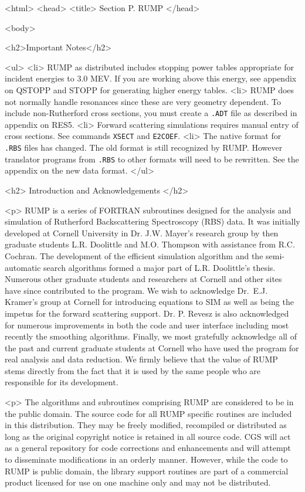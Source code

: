 <html>
<head>
<title> Section P. RUMP
</head>

<body>

<h2>Important Notes</h2>

<ul>
<li> RUMP as distributed includes stopping power tables
appropriate for incident energies to 3.0 MEV.  If you are working above this
energy, see appendix on QSTOPP and STOPP for generating higher energy tables.
<li> RUMP does not normally handle resonances since these are very
geometry dependent.  To include non-Rutherford cross sections, you must
create a {\tt .ADT} file as described in appendix on RES5.
<li> Forward scattering simulations requires manual entry of cross
sections.  See commands {\tt XSECT} and {\tt E2COEF}.
<li> The native format for {\tt .RBS} files has changed. The old
format is still recognized by RUMP.  However translator programs from
{\tt .RBS} to other formats will need to be rewritten.  See the appendix on
the new data format.
</ul>

<h2> Introduction and Acknowledgements </h2>

<p> 
RUMP is a series of FORTRAN subroutines designed for the analysis and
simulation of Rutherford Backscattering Spectroscopy (RBS) data.  It was
initially developed at Cornell University in Dr. J.W. Mayer's research group
by then graduate students L.R. Doolittle and M.O. Thompson with assistance
from R.C. Cochran.  The development of the efficient simulation algorithm and
the semi-automatic search algorithms formed a major part of L.R. Doolittle's
thesis.  Numerous other graduate students and researchers at Cornell and other
sites have since contributed to the program.  We wish to acknowledge Dr.\
E.J. Kramer's group at Cornell for introducing equations to SIM as well as
being the impetus for the forward scattering support. Dr. P. Revesz is also
acknowledged for numerous improvements in both the code and user interface
including most recently the smoothing algorithms.  Finally, we most gratefully
acknowledge all of the past and current graduate students at Cornell who have
used the program for real analysis and data reduction.  We firmly believe that
the value of RUMP stems directly from the fact that it is used by the same
people who are responsible for its development.

<p>
The algorithms and subroutines comprising RUMP are considered to be in the
public domain.  The source code for all RUMP specific routines are included in
this distribution.  They may be freely modified, recompiled or distributed
as long as the original copyright notice is retained in all source code.  CGS
will act as a general repository for code corrections and enhancements and
will attempt to disseminate modifications in an orderly manner.  However,
while the code to RUMP is public domain, the library support routines are part
of a commercial product licensed for use on one machine only and may not be
distributed.

